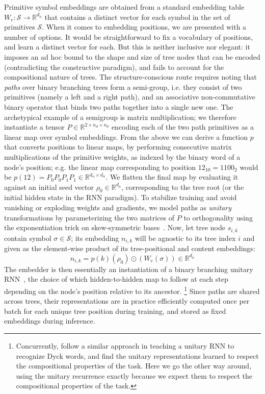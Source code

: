 Primitive symbol embeddings are obtained from a standard embedding table $W_e: \mathcal{S} \to \mathbb{R}^{d_n}$ that contains a distinct vector for each symbol in the set of primitives $\mathcal{S}$. 
When it comes to embedding positions, we are presented with a number of options.
It would be straightforward to fix a vocabulary of positions, and learn a distinct vector for each.
But this is neither inclusive nor elegant: it imposes an ad hoc bound to the shape and size of tree nodes that can be encoded (contradicting the constructive paradigm), and fails to account for the compositional nature of trees.
The structure-conscious route requires noting that \textit{paths} over binary branching trees form a semi-group, i.e. they consist of two primitives (namely a left and a right path), and an associative non-commutative binary operator that binds two paths together into a single new one.
The archetypical example of a semigroup is matrix multiplication; we therefore instantiate a tensor $P \in \mathbb{R}^{2 \times n_d \times n_d}$ encoding each of the two path primitives as a linear map over symbol embeddings.
From the above we can derive a function $p$ that converts positions to linear maps, by performing consecutive matrix multiplications of the primitive weights, as indexed by the binary word of a node's position; e.g. the linear map corresponding to position $12_{10} = 1100_{2}$ would be $p(12) = P_0P_0P_1P_1 \in \mathbb{R}^{d_n \times d_n}$.
We flatten the final map by evaluating it against an initial seed vector $\rho_0 \in \mathbb{R}^{d_n}$, corresponding to the tree root (or the initial hidden state in the RNN paradigm).
To stabilize training and avoid vanishing or exploding weights and gradients, we model paths as \textit{unitary} transformations by parameterizing the two matrices of $P$ to orthogonality using the exponentiation trick on skew-symmetric bases~\cite{bader2019computing,lezcano2019trivializations}.
Now, let tree node $s_{i, k}$ contain symbol $\sigma \in \mathcal{S}$; its embedding $n_{i,k}$ will be agnostic to its tree index $i$ and given as the element-wise product of its tree-positional and content embeddings:
\begin{equation}
n_{i, k} = p(k)(\rho_0) \odot \left(W_e(\sigma)\right) \in \mathbb{R}^{d_n}
\end{equation}
The embedder is then essentially an instantiation of a binary branching unitary RNN~\cite{arjovsky2016unitary}, the choice of which hidden-to-hidden map to follow at each step depending on the node's position relative to its ancestor.%
	\footnote{Concurrently, \citet{bernardy2022assessing} follow a similar approach in teaching a unitary RNN to recognize Dyck words, and find the unitary representations learned to respect the compositional properties of the task.
	Here we go the other way around, using the unitary recurrence exactly because we expect them to respect the compositional properties of the task.}
Since paths are shared across trees, their representations are in practice efficiently computed once per batch for each unique tree position during training, and stored as fixed embeddings during inference.

